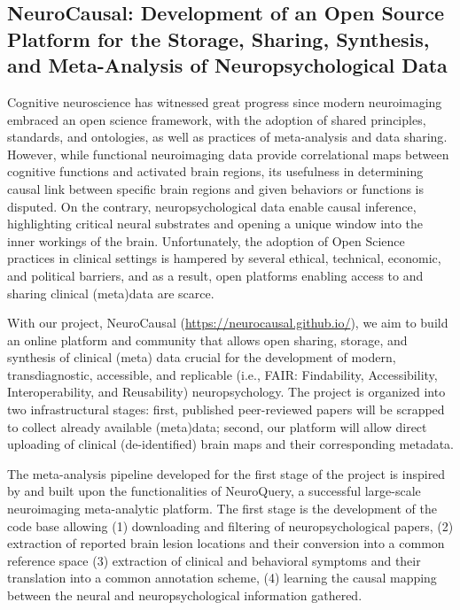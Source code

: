 \documentclass[../main.tex]{subfiles}
\begin{document}
\subsection{NeuroCausal: Development of an Open Source Platform for the Storage, Sharing, Synthesis, and Meta-Analysis of Neuropsychological Data}\label{sec:NeuroCausal}


Cognitive neuroscience has witnessed great progress since modern neuroimaging embraced an open science framework, with the adoption of shared principles\supercite{Wilkinson2016}, standards\supercite{Gorgolewski2016}, and ontologies\supercite{poldrack_cognitive_2011}, as well as practices of meta-analysis\supercite{dockes_neuroquery_2020, yarkoni_large-scale_2011} and data sharing\supercite{gorgolewski2015}. However, while functional neuroimaging data provide correlational maps between cognitive functions and activated brain regions, its usefulness in determining causal link between specific brain regions and given behaviors or functions is disputed\supercite{weber_functional_2010, siddiqi_causal_2022}. On the contrary, neuropsychological data enable causal inference, highlighting critical neural substrates and opening a unique window into the inner workings of the brain\supercite{price_evolution_2018}. Unfortunately, the adoption of Open Science practices in clinical settings is hampered by several ethical, technical, economic, and political barriers, and as a result, open platforms enabling access to and sharing clinical (meta)data are scarce\supercite{lariviere_enigma_2021}.

With our project, NeuroCausal (\url{https://neurocausal.github.io/}), we aim to build an online platform and community that allows open sharing, storage, and synthesis of clinical (meta) data crucial for the development of modern, transdiagnostic, accessible, and replicable (i.e., FAIR: Findability, Accessibility, Interoperability, and Reusability) neuropsychology. The project is organized into two infrastructural stages: first, published peer-reviewed papers will be scrapped to collect already available (meta)data; second, our platform will allow direct uploading of clinical (de-identified) brain maps and their corresponding metadata. 

The meta-analysis pipeline developed for the first stage of the project is inspired by and built upon the functionalities of NeuroQuery\supercite{dockes_neuroquery_2020}, a successful large-scale neuroimaging meta-analytic platform. The first stage is the development of the code base allowing (1) downloading and filtering of neuropsychological papers, (2) extraction of reported brain lesion locations and their conversion into a common reference space (3) extraction of clinical and behavioral symptoms and their translation into a common annotation scheme, (4) learning the causal mapping between the neural and neuropsychological information gathered.
\end{document}
